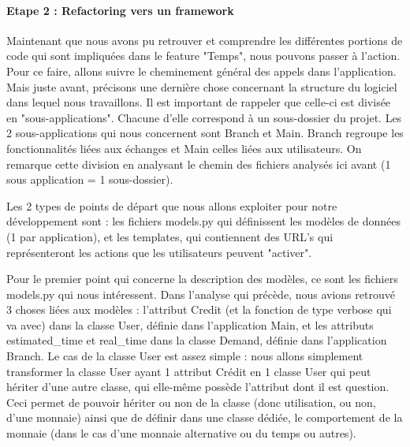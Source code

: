 \paragraph{Etape 2 : Refactoring vers un framework}

Maintenant que nous avons pu retrouver et comprendre les différentes portions de code qui sont impliquées dans le feature "Temps",  nous pouvons passer à l'action.  Pour ce faire,  allons suivre le cheminement général des appels dans l'application.  Mais juste avant,  précisons une dernière chose concernant la structure du logiciel dans lequel nous travaillons.  Il est important de rappeler que celle-ci est divisée en "sous-applications".  Chacune d'elle correspond à un sous-dossier du projet.  Les 2 sous-applications qui nous concernent sont Branch et Main.  Branch regroupe les fonctionnalités liées aux échanges et Main celles liées aux utilisateurs.  On remarque cette division en analysant le chemin des fichiers analysés ici avant (1 sous application = 1 sous-dossier).  

Les 2 types de points de départ que nous allons exploiter pour notre développement sont : les fichiers models.py qui définissent les modèles de données (1 par application),  et les templates,  qui contiennent des URL's qui représenteront les actions que les utilisateurs peuvent "activer".  

Pour le premier point qui concerne la description des modèles,  ce sont les fichiers models.py qui nous intéressent.  Dans l'analyse qui précède,  nous avions retrouvé 3 choses liées aux modèles : l'attribut Credit (et la fonction de type verbose qui va avec) dans la classe User,  définie dans l'application Main,  et les attributs estimated\_time et real\_time dans la classe Demand,  définie dans l'application Branch.  Le cas de la classe User est assez simple : nous allons simplement transformer la classe User ayant 1 attribut Crédit en 1 classe User qui peut hériter d'une autre classe,  qui elle-même possède l'attribut dont il est question.  Ceci permet de pouvoir hériter ou non de la classe (donc utilisation,  ou non,  d'une monnaie) ainsi que de définir dans une classe dédiée,  le comportement de la monnaie (dans le cas d'une monnaie alternative ou du temps ou autres).  

